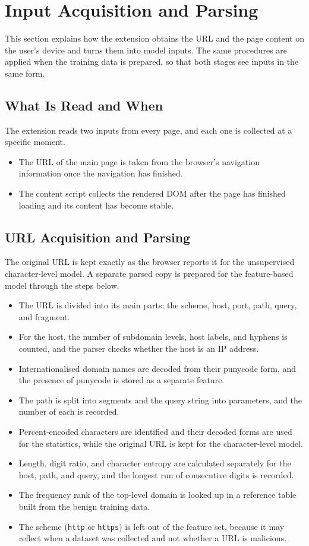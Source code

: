 \documentclass{FastFyp}
\begin{document}
\section{Input Acquisition and Parsing}
\label{sec:input-acquisition}
This section explains how the extension obtains the URL and the page content on the user's device and turns them into model inputs. The same procedures are applied when the training data is prepared, so that both stages see inputs in the same form.

\subsection{What Is Read and When}
The extension reads two inputs from every page, and each one is collected at a specific moment.
\begin{itemize}
    \item The URL of the main page is taken from the browser's navigation information once the navigation has finished.
    \item The content script collects the rendered DOM after the page has finished loading and its content has become stable.
\end{itemize}

\subsection{URL Acquisition and Parsing}
\label{sec:url-parsing}
The original URL is kept exactly as the browser reports it for the unsupervised character-level model. A separate parsed copy is prepared for the feature-based model through the steps below.
\begin{itemize}
    \item The URL is divided into its main parts: the scheme, host, port, path, query, and fragment.
    \item For the host, the number of subdomain levels, host labels, and hyphens is counted, and the parser checks whether the host is an IP address.
    \item Internationalised domain names are decoded from their punycode form, and the presence of punycode is stored as a separate feature.
    \item The path is split into segments and the query string into parameters, and the number of each is recorded.
    \item Percent-encoded characters are identified and their decoded forms are used for the statistics, while the original URL is kept for the character-level model.
    \item Length, digit ratio, and character entropy are calculated separately for the host, path, and query, and the longest run of consecutive digits is recorded.
    \item The frequency rank of the top-level domain is looked up in a reference table built from the benign training data.
    \item The scheme (\texttt{http} or \texttt{https}) is left out of the feature set, because it may reflect when a dataset was collected and not whether a URL is malicious.
\end{itemize}
\end{document}
